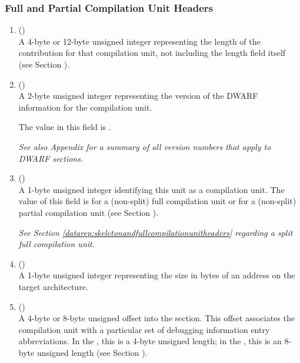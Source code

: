 \subsubsection{Full and Partial Compilation Unit Headers}
\label{datarep:compilationunitheader}
\begin{enumerate}[1. ]

\item \HFNunitlength{} () \\
A 4-byte or 12-byte 
unsigned integer representing the length
of the \dotdebuginfo{} contribution for that compilation unit,
not including the length field itself
\bb
(see Section ).
\eb

\item  \HFNversion{} (\HFTuhalf) \\
A 2-byte unsigned integer representing the version of the
DWARF information for the compilation unit.
 
The value in this field is \versiondotdebuginfo.

\textit{See also Appendix 
for a summary of all version numbers that apply to DWARF sections.}

\item \HFNunittype{} (\HFTubyte) \\
A 1-byte unsigned integer identifying this unit as a compilation unit.
The value of this field is 
\DWUTcompile{} for a (non-split) full compilation unit or
\DWUTpartial{} for a (non-split) partial compilation unit
(see Section ).

\textit{See Section \ref{datarep:skeletonandfullcompilationunitheaders} 
regarding a split full compilation unit.}

\item \HFNaddresssize{} (\HFTubyte) \\
A 1-byte unsigned integer representing the size in bytes of
an address on the target architecture.
\db

\item \HFNdebugabbrevoffset{} () \\
A 
4-byte or 8-byte unsigned offset into the \dotdebugabbrev{}
section. This offset associates the compilation unit with a
particular set of debugging information entry abbreviations. In
the \thirtytwobitdwarfformat, this is a 4-byte unsigned length;
in the \sixtyfourbitdwarfformat, this is an 8-byte unsigned length
(see Section ).

\end{enumerate}

